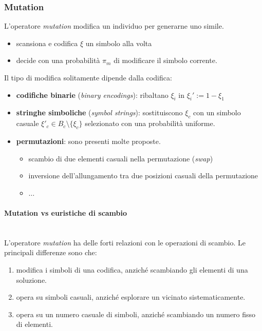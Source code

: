 \documentclass{article}
\begin{document}
\subsubsection{Mutation}
L'operatore \textit{mutation} modifica un individuo per generarne uno simile.
\begin{itemize}
    \item scansiona e codifica $\xi$ un simbolo alla volta
    \item decide con una probabilità $\pi_m$ di modificare il simbolo corrente.
\end{itemize}
Il tipo di modifica solitamente dipende dalla codifica:
\begin{itemize}
    \item \textbf{codifiche binarie} (\textit{binary encodings}): ribaltano $\xi_i$ in $\xi_i':=1-\xi_1$
    \item \textbf{stringhe simboliche} (\textit{symbol strings}): sostituiscono
    $\xi_c$ con un simbolo casuale $\xi'_c\in B_c\setminus\{\xi_c\}$ selezionato con
    una probabilità uniforme.
    \item \textbf{permutazioni}: sono presenti molte proposte.
    \begin{itemize}
        \item scambio di due elementi casuali nella permutazione (\textit{swap})
        \item inversione dell'allungamento tra due posizioni casuali della permutazione
        \item $\dots$
    \end{itemize}
\end{itemize}
\paragraph{Mutation vs euristiche di scambio}\mbox{}\\
L'operatore \textit{mutation} ha delle forti relazioni con le operazioni di scambio. Le
principali differenze sono che:
\begin{enumerate}
    \item modifica i simboli di una codifica, anziché scambiando gli elementi di una
    soluzione.
    \item opera su simboli casuali, anziché esplorare un vicinato sistematicamente.
    \item opera su un numero casuale di simboli, anziché scambiando un numero fisso
    di elementi.
\end{enumerate}
\end{document}
